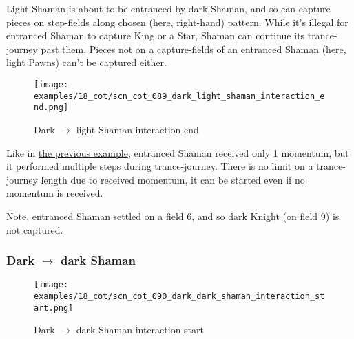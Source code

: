 Light Shaman is about to be entranced by dark Shaman, and so can capture pieces
on step-fields along chosen (here, right-hand) pattern. While it's illegal for
entranced Shaman to capture King or a Star, Shaman can continue its trance-journey
past them. Pieces not on a capture-fields of an entranced Shaman (here, light Pawns)
can't be captured either.

\clearpage %

\noindent
\begin{figure}[!h]
\texttt{[image: examples/18\_cot/scn\_cot\_089\_dark\_light\_shaman\_interaction\_end.png]}
\caption{Dark $\rightarrow$ light Shaman interaction end}
\label{fig:scn_cot_089_dark_light_shaman_interaction_end}
\end{figure}

Like in
\hyperref[fig:scn_cot_086_light_light_shaman_interaction_start]{the previous example},
entranced Shaman received only 1 momentum, but it performed multiple steps during
trance-journey. There is no limit on a trance-journey length due to received momentum,
it can be started even if no momentum is received.

Note, entranced Shaman settled on a field 6, and so dark Knight (on field 9) is not
captured.

\clearpage %

\subsubsection*{Dark $\rightarrow$ dark Shaman}
\label{sec:Conquest of Tlalocan/Trance-journey/Interactions/Dark --> dark Shaman}

\vspace*{-1.5\baselineskip}
\noindent
\begin{figure}[!h]
\texttt{[image: examples/18\_cot/scn\_cot\_090\_dark\_dark\_shaman\_interaction\_start.png]}
\vspace*{-1.4\baselineskip}
\caption{Dark $\rightarrow$ dark Shaman interaction start}
\label{fig:scn_cot_090_dark_dark_shaman_interaction_start}
\end{figure}

